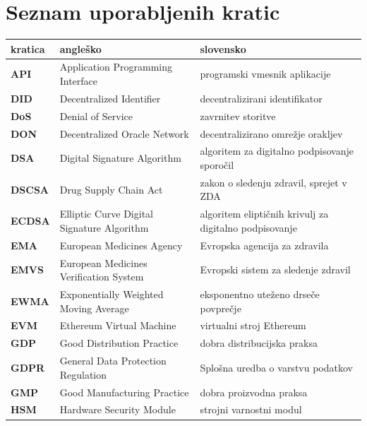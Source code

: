 \chapter*{Seznam uporabljenih kratic}
\thispagestyle{empty}
\begin{table}[ht]
  \centering
  \small
  \setlength{\tabcolsep}{6pt} %
  \begin{tabularx}{\textwidth}{l|X|X}
    \textbf{kratica} & \textbf{angleško} & \textbf{slovensko} \\ \hline
    \textbf{API}     & Application Programming Interface        & programski vmesnik aplikacije \\
    \textbf{DID}     & Decentralized Identifier                 & decentralizirani identifikator \\
    \textbf{DoS}     & Denial of Service                        & zavrnitev storitve \\
    \textbf{DON}     & Decentralized Oracle Network             & decentralizirano omrežje orakljev \\
    \textbf{DSA}     & Digital Signature Algorithm              & algoritem za digitalno podpisovanje sporočil \\
    \textbf{DSCSA}   & Drug Supply Chain Act                    & zakon o sledenju zdravil, sprejet v ZDA \\
    \textbf{ECDSA}   & Elliptic Curve Digital Signature Algorithm & algoritem eliptičnih krivulj za digitalno podpisovanje \\
    \textbf{EMA}     & European Medicines Agency                & Evropska agencija za zdravila \\
    \textbf{EMVS}     & European Medicines Verification System  & Evropski sistem za sledenje zdravil \\
    \textbf{EWMA}    & Exponentially Weighted Moving Average    & eksponentno uteženo drseče povprečje \\
    \textbf{EVM}     & Ethereum Virtual Machine                 & virtualni stroj Ethereum \\
    \textbf{GDP}     & Good Distribution Practice               & dobra distribucijska praksa \\
    \textbf{GDPR}    & General Data Protection Regulation       & Splošna uredba o varstvu podatkov \\
    \textbf{GMP}     & Good Manufacturing Practice              & dobra proizvodna praksa \\
    \textbf{HSM}     & Hardware Security Module                 & strojni varnostni modul \\ 
  \end{tabularx}
\end{table}

